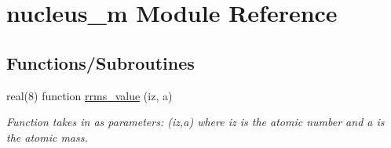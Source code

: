 \hypertarget{namespacenucleus__m}{}\section{nucleus\+\_\+m Module Reference}
\label{namespacenucleus__m}
\subsection*{Functions/\+Subroutines}
\begin{DoxyCompactItemize}
\item 
real(8) function \mbox{\hyperlink{namespacenucleus__m_aa70383e98e9176269442449160eaaea0}{rrms\+\_\+value}} (iz, a)
\begin{DoxyCompactList}\small\item\em Function takes in as parameters\+: (iz,a) where \textquotesingle{}iz\textquotesingle{} is the atomic number and \textquotesingle{}a\textquotesingle{} is the atomic mass. \end{DoxyCompactList}\end{DoxyCompactItemize}
